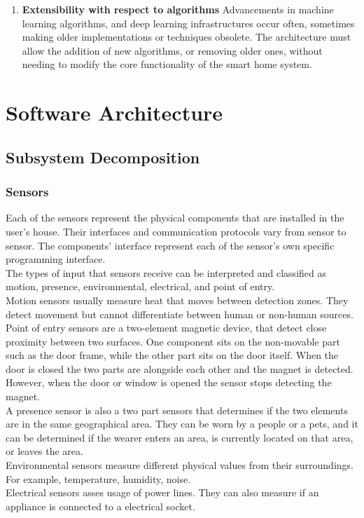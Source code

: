 \begin{enumerate}
\item \textbf{Extensibility with respect to algorithms}
Advancements in machine learning algorithms, and deep learning infrastructures occur often, sometimes making older implementations or techniques obsolete. The architecture must allow the addition of new algorithms, or removing older ones, without needing to modify the core functionality of the smart home system. 


\end{enumerate}
	
\section{Software Architecture}
\subsection{Subsystem Decomposition}
\label{subsytem}



\subsubsection{Sensors}

Each of the sensors represent the physical components that are installed in the user's house. Their interfaces and communication protocols vary from sensor to sensor. The components' interface represent each of the sensor's own specific programming interface.\\
The types of input that sensors receive can be interpreted and classified as motion, presence, environmental, electrical, and point of entry.\\
Motion sensors usually measure heat that moves between detection zones. They detect movement but cannot differentiate between human or non-human sources. \\
Point of entry sensors are a two-element magnetic device, that detect close proximity between two surfaces. One component sits on the non-movable part such as the door frame, while the other part sits on the door itself. When the door is closed the two parts are alongside each other and the magnet is detected. However, when the door or window is opened the sensor stops detecting the magnet. \\
A presence sensor is also a two part sensors that determines if the two elements are in the same geographical area. They can be worn by a people or a pets, and it can be determined if the wearer enters an area, is currently located on that area, or leaves the area. \\
Environmental sensors measure different physical values from their surroundings. For example, temperature, humidity, noise. \\
Electrical sensors asses usage of power lines. They can also measure if an appliance is connected to a electrical socket. 

